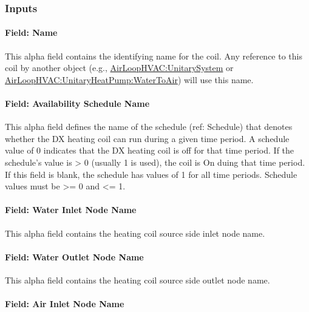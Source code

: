 \subsubsection{Inputs}\label{inputs-33}

\paragraph{Field: Name}\label{field-name-32}

This alpha field contains the identifying name for the coil. Any reference to this coil by another object (e.g., \hyperref[airloophvacunitarysystem]{AirLoopHVAC:UnitarySystem} or \hyperref[airloophvacunitaryheatpumpwatertoair]{AirLoopHVAC:UnitaryHeatPump:WaterToAir}) will use this name.

\paragraph{Field: Availability Schedule Name}\label{field-availability-schedule-name-16-010}

This alpha field defines the name of the schedule (ref: Schedule) that denotes whether the DX heating coil can run during a given time period. A schedule value of 0 indicates that the DX heating coil is off for that time period. If the schedule's value is \textgreater{} 0 (usually 1 is used), the coil is On duing that time period. If this field is blank, the schedule has values of 1 for all time periods. Schedule values must be \textgreater{}= 0 and \textless{}= 1.

\paragraph{Field: Water Inlet Node Name}\label{field-water-inlet-node-name-9}

This alpha field contains the heating coil source side inlet node name.

\paragraph{Field: Water Outlet Node Name}\label{field-water-outlet-node-name-9}

This alpha field contains the heating coil source side outlet node name.

\paragraph{Field: Air Inlet Node Name}\label{field-air-inlet-node-name-20}

